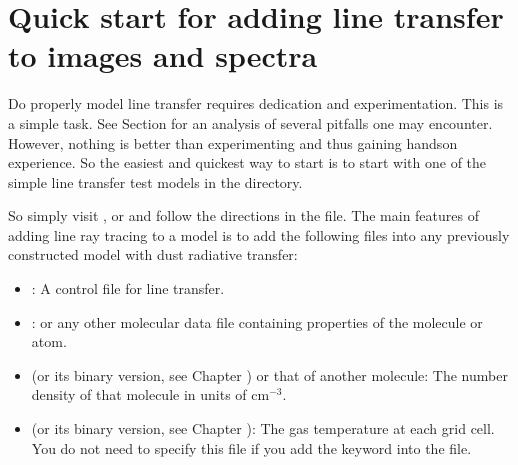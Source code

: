 \documentclass[letterpaper,10pt,english]{sphinxmanual}
\begin{document}
\section{Quick start for adding line transfer to images and spectra}
\label{\detokenize{lineradtrans:quick-start-for-adding-line-transfer-to-images-and-spectra}}
Do properly model line transfer requires dedication and experimentation.
This is  a simple task. See Section {\hyperref[\detokenize{lineradtrans:sec-lines-pitfalls}]{}} for an
analysis of several pitfalls one may encounter. However, nothing is better
than experimenting and thus gaining hands\sphinxhyphen{}on experience. So the easiest and
quickest way to start is to start with one of the simple line transfer test
models in the  directory.

So simply visit , 
or  and follow the directions in the  file.
The main features of adding line ray tracing to a model is
to add the following files into any previously constructed model with dust
radiative transfer:
\begin{itemize}
\item {} 
: A control file for line transfer.

\item {} 
: or any other molecular data file
containing properties of the molecule or atom.

\item {} 
 (or its binary version, see Chapter
{\hyperref[\detokenize{binaryio:chap-binary-io}]{}}) or that of another molecule: The number density of
that molecule in units of \(\mathrm{cm}^{-3}\).

\item {} 
 (or its binary version, see Chapter
{\hyperref[\detokenize{binaryio:chap-binary-io}]{}}): The gas temperature at each grid cell. You do not
need to specify this file if you add the keyword 
into the  file.

\end{itemize}
\end{document}
